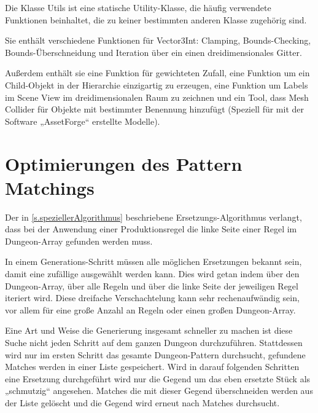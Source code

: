 Die Klasse Utils ist eine statische Utility-Klasse, die häufig verwendete Funktionen beinhaltet, die zu keiner bestimmten anderen Klasse zugehörig sind.

Sie enthält verschiedene Funktionen für Vector3Int\cite[Seite: Vector3Int]{unitySciptingReference}: Clamping, Bounds-Checking, Bounds-Überschneidung und Iteration über ein einen dreidimensionales Gitter.

Außerdem enthält sie eine Funktion für gewichteten Zufall, eine Funktion um ein Child-Objekt in der Hierarchie einzigartig zu erzeugen, eine Funktion um Labels im Scene View im dreidimensionalen Raum zu zeichnen und ein Tool, dass Mesh Collider für Objekte mit bestimmter Benennung hinzufügt (Speziell für mit der Software „AssetForge“ erstellte Modelle).

\section{Optimierungen des Pattern Matchings}\label{s.optimierungen}

Der in \ref{s.speziellerAlgorithmus} beschriebene Ersetzungs-Algorithmus verlangt, dass bei der Anwendung einer Produktionsregel die linke Seite einer Regel im Dungeon-Array gefunden werden muss.

In einem Generations-Schritt müssen alle möglichen Ersetzungen bekannt sein, damit eine zufällige ausgewählt werden kann. Dies wird getan indem über den Dungeon-Array, über alle Regeln und über die linke Seite der jeweiligen Regel iteriert wird. Diese dreifache Verschachtelung kann sehr rechenaufwändig sein, vor allem für eine große Anzahl an Regeln oder einen großen Dungeon-Array. 






Eine Art und Weise die Generierung insgesamt schneller zu machen ist diese Suche nicht jeden Schritt auf dem ganzen Dungeon durchzuführen. Stattdessen wird nur im ersten Schritt das gesamte Dungeon-Pattern durchsucht, gefundene Matches werden in einer Liste gespeichert. Wird in darauf folgenden Schritten eine Ersetzung durchgeführt wird nur die Gegend um das eben ersetzte Stück als „schmutzig“ angesehen. Matches die mit dieser Gegend überschneiden werden aus der Liste gelöscht und die Gegend wird erneut nach Matches durchsucht. 

